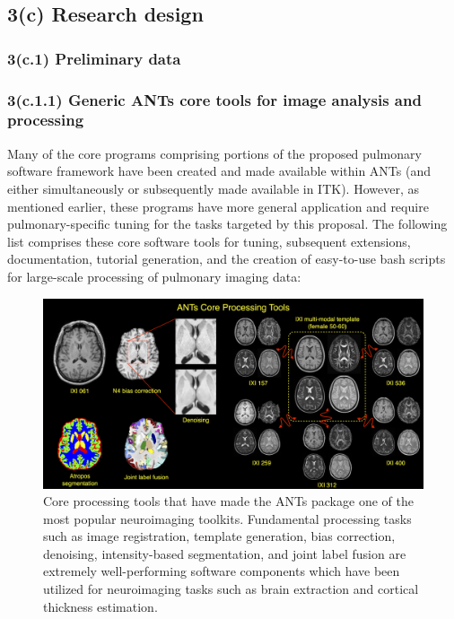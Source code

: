 \documentclass[11pt,]{article}
\begin{document}
\subsection{\textbf{3(c) Research design}}\label{c-research-design}

\subsubsection{3(c.1) Preliminary data}\label{c.1-preliminary-data}

\subsubsection{3(c.1.1) Generic ANTs core tools for image analysis and
processing}\label{c.1.1-generic-ants-core-tools-for-image-analysis-and-processing}

Many of the core programs comprising portions of the proposed pulmonary
software framework have been created and made available within ANTs (and
either simultaneously or subsequently made available in ITK). However,
as mentioned earlier, these programs have more general application and
require pulmonary-specific tuning for the tasks targeted by this
proposal. The following list comprises these core software tools for
tuning, subsequent extensions, documentation, tutorial generation, and
the creation of easy-to-use bash scripts for large-scale processing of
pulmonary imaging data:

\begin{figure}[htbp]
\centering
\includegraphics{Figs/coreANtsToolsNeuro.png}
\caption{Core processing tools that have made the ANTs package one of
the most popular neuroimaging toolkits. Fundamental processing tasks
such as image registration, template generation, bias correction,
denoising, intensity-based segmentation, and joint label fusion are
extremely well-performing software components which have been utilized
for neuroimaging tasks such as brain extraction and cortical thickness
estimation.}
\end{figure}
\end{document}
